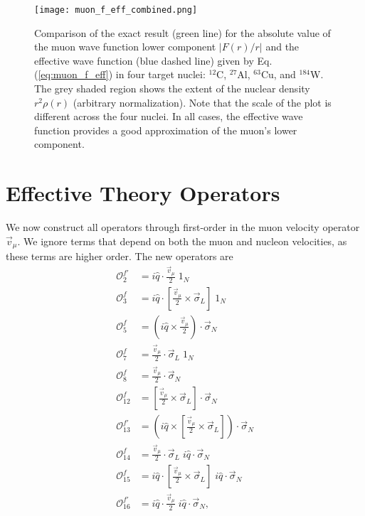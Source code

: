 \documentclass{book}[letterpaper,12pt]
\begin{document}
\begin{figure}
\centering
\texttt{[image: muon\_f\_eff\_combined.png]}
\caption{Comparison of the exact result (green line) for the absolute value of the muon wave function lower component $|F(r)/r|$ and the effective wave function (blue dashed line) given by Eq. (\ref{eq:muon_f_eff}) in four target nuclei: $^{12}$C, $^{27}$Al, $^{63}$Cu, and $^{184}$W. The grey shaded region shows the extent of the nuclear density $r^2\rho(r)$ (arbitrary normalization). Note that the scale of the plot is different across the four nuclei. In all cases, the effective wave function provides a good approximation of the muon's lower component.} 
\label{fig:muon_f_eff}
\end{figure}


\section{Effective Theory Operators}
We now construct all operators through first-order in the muon velocity operator $\vec{v}_{\mu}$. We ignore terms that depend on both the muon and nucleon velocities, as these terms are higher order. The new operators are
\begin{equation}
\begin{split}
\mathcal{O}_2^{f'}&=i\hat{q}\cdot\frac{\vec{v}_{\mu}}{2}\;1_N\\
\mathcal{O}_3^f&=i\hat{q}\cdot\left[\frac{\vec{v}_{\mu}}{2}\times\vec{\sigma}_L\right]\;1_N\\
\mathcal{O}_5^f&=\left(i\hat{q}\times\frac{\vec{v}_{\mu}}{2}\right)\cdot\vec{\sigma}_N\\
\mathcal{O}_7^f&=\frac{\vec{v}_{\mu}}{2}\cdot\vec{\sigma}_L\;1_N\\
\mathcal{O}_8^f&=\frac{\vec{v}_{\mu}}{2}\cdot\vec{\sigma}_N\\
\mathcal{O}_{12}^f&=\left[\frac{\vec{v}_{\mu}}{2}\times\vec{\sigma}_L\right]\cdot\vec{\sigma}_N\\
\mathcal{O}_{13}^{f'}&=\left(i\hat{q}\times\left[\frac{\vec{v}_{\mu}}{2}\times\vec{\sigma}_L\right]\right)\cdot\vec{\sigma}_N\\
\mathcal{O}_{14}^f&=\frac{\vec{v}_{\mu}}{2}\cdot\vec{\sigma}_L\;i\hat{q}\cdot\vec{\sigma}_N\\
\mathcal{O}_{15}^f&=i\hat{q}\cdot\left[\frac{\vec{v}_{\mu}}{2}\times\vec{\sigma}_L\right]\;i\hat{q}\cdot\vec{\sigma}_N\\
\mathcal{O}_{16}^{f'}&=i\hat{q}\cdot\frac{\vec{v}_{\mu}}{2}\;i\hat{q}\cdot\vec{\sigma}_N,
\end{split}
\end{equation}
\end{document}
